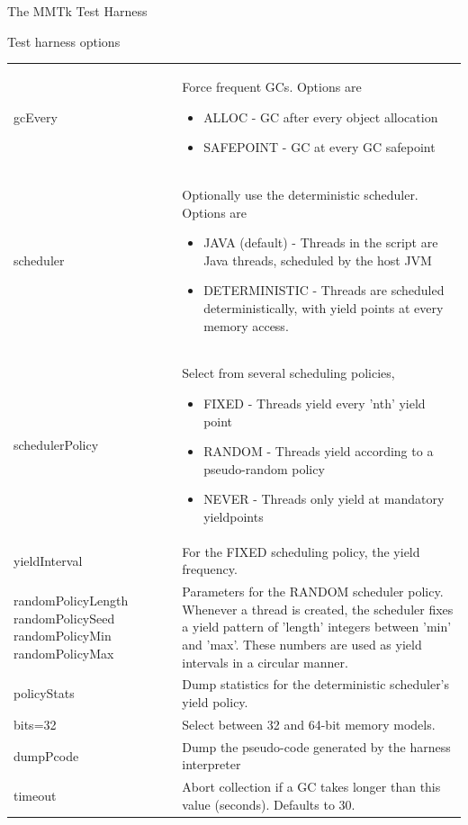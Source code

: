 \begin{chapter}{The MMTk Test Harness}
\begin{section}{Test harness options}
\begin{center}
\begin{longtable}{p{}p{}}
gcEvery & Force frequent GCs.  Options are
\begin{itemize}
  \item ALLOC - GC after every object allocation 
  \item SAFEPOINT - GC at every GC safepoint
\end{itemize} \\
scheduler & Optionally use the deterministic scheduler.  Options are
\begin{itemize}
  \item JAVA (default) - Threads in the script are Java threads, scheduled by the host JVM
  \item DETERMINISTIC - Threads are scheduled deterministically, with yield points at every memory access.
\end{itemize} \\
schedulerPolicy & Select from several scheduling policies,
\begin{itemize}
  \item FIXED - Threads yield every 'nth' yield point
  \item RANDOM - Threads yield according to a pseudo-random policy
  \item NEVER - Threads only yield at mandatory yieldpoints
\end{itemize} \\
yieldInterval & For the FIXED scheduling policy, the yield frequency. \\
randomPolicyLength \newline randomPolicySeed \newline randomPolicyMin \newline randomPolicyMax & Parameters for the RANDOM scheduler policy.  Whenever a thread is created, the scheduler fixes a yield pattern of 'length' integers between 'min' and 'max'.  These numbers are used as yield intervals in a circular manner. \\
policyStats & Dump statistics for the deterministic scheduler's yield policy. \\
bits=32\textbar 64 & Select between 32 and 64-bit memory models. \\
dumpPcode & Dump the pseudo-code generated by the harness interpreter \\
timeout & Abort collection if a GC takes longer than this value (seconds).  Defaults to 30. \\
\end{longtable}
\end{center}


\end{section}
\end{chapter}
